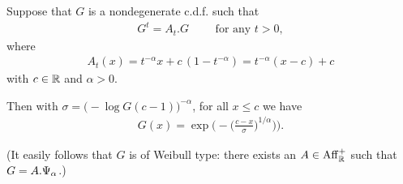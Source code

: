 \begin{lemma}
  \label{lem:characterization-self-similar-family-neg-index}
  Suppose that $G$ is a nondegenerate c.d.f. such that
  \begin{align*}
    G^{t} = A_t . G \qquad \text{ for any } t > 0 ,
  \end{align*}
  where
  \begin{align*}
    A_t(x) = t^{-\alpha} x + c \, (1 - t^{-\alpha}) = t^{-\alpha} (x-c) + c
  \end{align*}
  with $c \in \mathbb{R}$ and $\alpha > 0$.

  Then with $\sigma = \big(- \log G(c-1)\big)^{-\alpha}$,
  for all $x \le c$ we have
  \begin{align*}
    G(x) = \exp \Big( - \big( \frac{c - x}{\sigma} \big)^{1/\alpha} \big) \Big) .
  \end{align*}

  (It easily follows that $G$ is of Weibull type: there exists
  an $A \in \mathrm{Aff}^+_{\mathbb{R}}$ such that $G = A.\Psi_{\alpha}$.)
\end{lemma}
